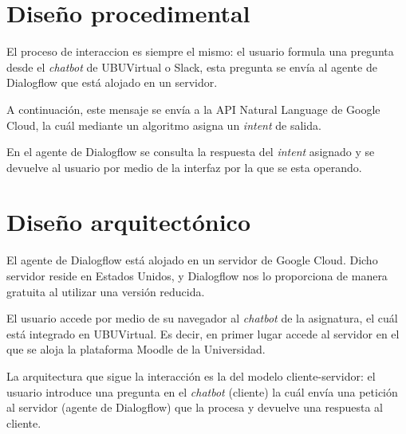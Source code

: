 

\section{Diseño procedimental}

El proceso de interaccion es siempre el mismo: el usuario formula una pregunta desde el \textit{chatbot} de UBUVirtual o Slack, esta pregunta se envía al agente de Dialogflow que está alojado en un servidor. 

A continuación, este mensaje se envía a la API Natural Language de Google Cloud, la cuál mediante un algoritmo asigna un \textit{intent} de salida.

En el agente de Dialogflow se consulta la respuesta del \textit{intent} asignado y se devuelve al usuario por medio de la interfaz por la que se esta operando.


\newpage

\section{Diseño arquitectónico}

El agente de Dialogflow está alojado en un servidor de Google Cloud. Dicho servidor reside en Estados Unidos, y Dialogflow nos lo proporciona de manera gratuita al utilizar una versión reducida.

El usuario accede por medio de su navegador al \textit{chatbot} de la asignatura, el cuál está integrado en UBUVirtual. Es decir, en primer lugar accede al servidor en el que se aloja la plataforma Moodle de la Universidad. 

La arquitectura que sigue la interacción es la del modelo cliente-servidor: el usuario introduce una pregunta en el \textit{chatbot} (cliente) la cuál envía una petición al servidor (agente de Dialogflow) que
 la procesa y devuelve una respuesta al cliente.



